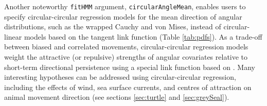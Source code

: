 \documentclass[12pt]{article}\usepackage[]{graphicx}\usepackage[]{color}
\begin{document}
Another noteworthy \verb|fitHMM| argument, \verb|circularAngleMean|, enables users to specify circular-circular regression models for the mean direction of angular distributions, such as the wrapped Cauchy and von Mises, instead of circular-linear models based on the tangent link function (Table \ref{tab:pdfs}). %
As a trade-off between biased and correlated movements, circular-circular regression models weight the attractive (or repulsive) strengths of angular covariates relative to short-term directional persistence using a special link function based on \cite{DuchesneEtAl2015}. Many interesting hypotheses can be addressed using circular-circular regression, including the effects of wind, sea surface currents, and centres of attraction on animal movement direction (see sections \ref{sec:turtle} and \ref{sec:greySeal}). 
\end{document}
